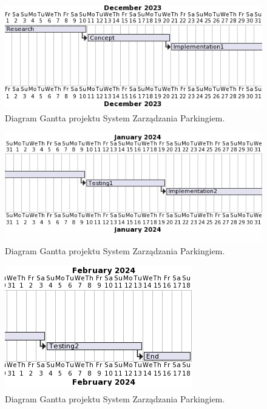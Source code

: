 \documentclass{article}
\begin{document}
\begin{figure}[H]
\centering
\includegraphics[width=\textwidth]{photos/gant1.png}
\caption{Diagram Gantta projektu System Zarządzania Parkingiem.}
\end{figure}
\begin{figure}[H]
\centering
\includegraphics[width=\textwidth]{photos/gant2.png}
\caption{Diagram Gantta projektu System Zarządzania Parkingiem.}
\end{figure}
\begin{figure}[H]
\centering
\includegraphics[width=\textwidth]{photos/gant3.png}
\caption{Diagram Gantta projektu System Zarządzania Parkingiem.}
\end{figure}
\end{document}
